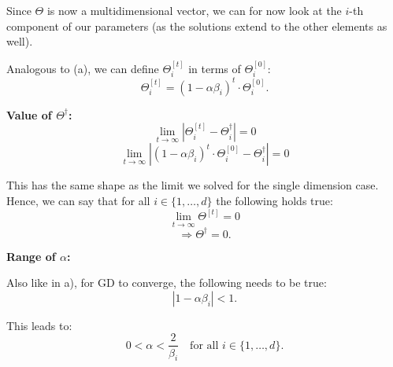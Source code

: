 \begin{answer}
    
    Since \(\Theta\) is now a multidimensional vector, 
    we can for now look at the \(i\)-th component of our parameters (as the solutions extend to the other elements as well).
    
    Analogous to (a), we can define \(\Theta_i^{[t]}\) in terms of \(\Theta_i^{[0]}\): 
    \[
    \Theta_i^{[t]} = (1 - \alpha \beta_i)^t \cdot \Theta_i^{[0]}.
    \]
    

    \textbf{Value of \(\Theta^\dagger\):}
    \[
    \lim_{t \to \infty} |\Theta_i^{[t]} - \Theta_i^\dagger| = 0
    \]
    \[
    \lim_{t \to \infty} |(1 - \alpha \beta_i)^t \cdot \Theta_i^{[0]} - \Theta_i^\dagger| = 0
    \]
    
    This has the same shape as the limit we solved for the single dimension case. Hence, we can say that for all \(i \in \{1, \ldots, d\}\) the following holds true:
    \[
    \lim_{t \to \infty} \Theta^{[t]} = 0
    \]
    \[
    \Rightarrow \Theta^{\dagger} = 0.
    \]
    
    \textbf{Range of \(\alpha\):}
    
    Also like in a), for GD to converge, the following needs to be true:
    \[
    |1 - \alpha \beta_i| < 1.
    \]
    
    This leads to:
    \[
    0 < \alpha < \frac{2}{\beta_i} \quad \text{for all } i \in \{1, \ldots, d\}.
    \]
    
\end{answer}